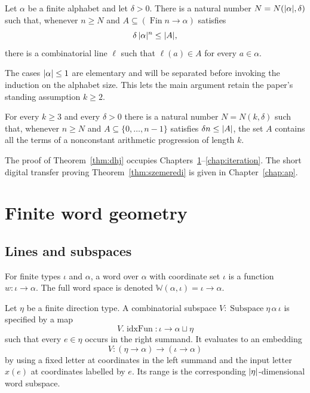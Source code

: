\begin{theorem}
\label{thm:dhj}
Let $\alpha$ be a finite alphabet and let $\delta>0$.  There is a natural number
$N=N(\lvert \alpha\rvert,\delta)$ such that, whenever $n\geq N$ and
$A\subseteq(\operatorname{Fin}n\to\alpha)$ satisfies
\[
  \delta\,\lvert \alpha\rvert^n\leq\lvert A\rvert,
\]
there is a combinatorial line $\ell$ such that $\ell(a)\in A$ for every $a\in\alpha$.
\end{theorem}

The cases $\lvert \alpha\rvert\leq 1$ are elementary and will be separated before invoking the induction
on the alphabet size.  This lets the main argument retain the paper's standing assumption
$k\geq2$.

\begin{theorem}
\label{thm:szemeredi}
For every $k\geq3$ and every $\delta>0$ there is a natural number $N=N(k,\delta)$ such
that, whenever $n\geq N$ and $A\subseteq\{0,\ldots,n-1\}$ satisfies
$\delta n\leq\lvert A\rvert$, the set $A$ contains all the terms of a nonconstant arithmetic
progression of length $k$.
\end{theorem}

The proof of Theorem~\ref{thm:dhj} occupies Chapters~\ref{chap:geometry}--\ref{chap:iteration}.
The short digital transfer proving Theorem~\ref{thm:szemeredi} is given in
Chapter~\ref{chap:ap}.


\chapter{Finite word geometry}
\label{chap:geometry}

\section{Lines and subspaces}

\begin{definition}[Words]
\label{def:word}
For finite types $\iota$ and $\alpha$, a word over $\alpha$ with coordinate set $\iota$ is a
function $w:\iota\to\alpha$.  The full word space is denoted
$\mathbb W(\alpha,\iota)=\iota\to\alpha$.
\end{definition}

\begin{definition}
\label{def:subspace}
\mathlibok
Let $\eta$ be a finite direction type.  A combinatorial subspace
$V:\operatorname{Subspace}\eta\,\alpha\,\iota$ is specified by a map
\[
  V.\operatorname{idxFun}:\iota\longrightarrow\alpha\sqcup\eta
\]
such that every $e\in\eta$ occurs in the right summand.  It evaluates to an embedding
\[
  V:(\eta\to\alpha)\longrightarrow(\iota\to\alpha)
\]
by using a fixed letter at coordinates in the left summand and the input letter $x(e)$ at
coordinates labelled by $e$.  Its range is the corresponding $\lvert \eta\rvert$-dimensional word
subspace.
\end{definition}

